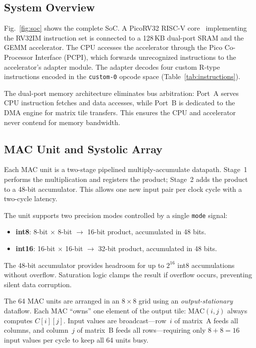\documentclass[conference]{IEEEtran}
\begin{document}
\subsection{System Overview}

Fig.~\ref{fig:soc} shows the complete SoC. A PicoRV32 RISC-V core~\cite{picorv32} implementing the RV32IM instruction set is connected to a 128\,KB dual-port SRAM and the GEMM accelerator. The CPU accesses the accelerator through the Pico Co-Processor Interface (PCPI), which forwards unrecognized instructions to the accelerator's adapter module. The adapter decodes four custom R-type instructions encoded in the \texttt{custom-0} opcode space (Table~\ref{tab:instructions}).

The dual-port memory architecture eliminates bus arbitration: Port~A serves CPU instruction fetches and data accesses, while Port~B is dedicated to the DMA engine for matrix tile transfers. This ensures the CPU and accelerator never contend for memory bandwidth.

\subsection{MAC Unit and Systolic Array}

Each MAC unit is a two-stage pipelined multiply-accumulate datapath. Stage~1 performs the multiplication and registers the product; Stage~2 adds the product to a 48-bit accumulator. This allows one new input pair per clock cycle with a two-cycle latency.

The unit supports two precision modes controlled by a single \texttt{mode} signal:
\begin{itemize}
    \item \textbf{int8}: 8-bit $\times$ 8-bit $\rightarrow$ 16-bit product, accumulated in 48 bits.
    \item \textbf{int16}: 16-bit $\times$ 16-bit $\rightarrow$ 32-bit product, accumulated in 48 bits.
\end{itemize}
The 48-bit accumulator provides headroom for up to $2^{16}$ int8 accumulations without overflow. Saturation logic clamps the result if overflow occurs, preventing silent data corruption.

The 64 MAC units are arranged in an $8\times8$ grid using an \emph{output-stationary} dataflow. Each MAC ``owns'' one element of the output tile: MAC$(i,j)$ always computes $C[i][j]$. Input values are broadcast---row~$i$ of matrix~A feeds all columns, and column~$j$ of matrix~B feeds all rows---requiring only $8+8=16$ input values per cycle to keep all 64 units busy.
\end{document}
